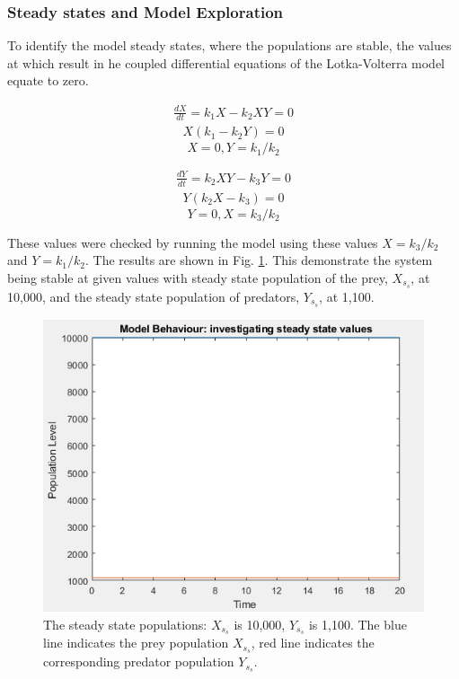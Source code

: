 \documentclass{article}
\begin{document}
\subsubsection{Steady states and Model Exploration}
To identify the model steady states, where the populations are stable, the values at which result in he coupled differential equations of the Lotka-Volterra model equate to zero. 

\begin{eqnarray*}
    \frac{dX}{dt} = k_1X - k_2XY = 0 
\end{eqnarray*}
\begin{eqnarray*}
    X ( k_1 - k_2Y ) = 0  
\end{eqnarray*}
\begin{equation}
    X = 0, Y = k_1 / k_2
\end{equation}

\begin{eqnarray*}
     \frac{dY}{dt} = k_2XY - k_3Y = 0
\end{eqnarray*}
\begin{eqnarray*}
   Y ( k_2X - k_3 ) = 0
\end{eqnarray*}
\begin{equation}
    Y = 0, X = k_3 / k_2
\end{equation}

These values were checked by running the model using these values $X = k_3 / k_2$ and $Y = k_1 / k_2$. The results are shown in Fig. \ref{fig:steady_states}. This demonstrate the system being stable at given values with steady state population of the prey, $X_s_s$, at 10,000, and the steady state population of predators, $Y_s_s$, at 1,100.

\begin{figure}[H]
    \includegraphics[width=\textwidth]{steady_state.PNG}
    \caption{The steady state populations: $X_s_s$ is 10,000, $Y_s_s$ is 1,100. The blue line indicates the prey population $X_s_s$, red line indicates the corresponding predator population $Y_s_s$.}
    \label{fig:steady_states}
\end{figure}
\end{document}
